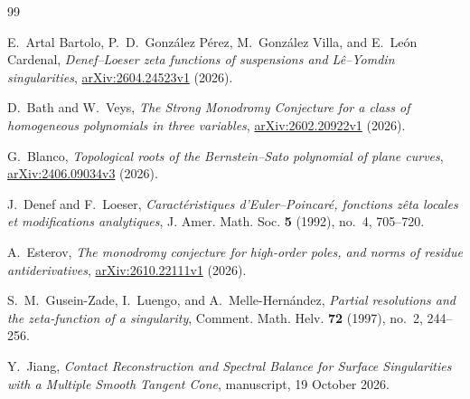 \documentclass[11pt]{article}
\numberwithin{equation}{section}
\theoremstyle{definition}
\theoremstyle{remark}
\begin{document}
\begin{thebibliography}{99}

E.~Artal Bartolo, P.~D.~Gonz\'alez P\'erez,
M.~Gonz\'alez Villa, and E.~Le\'on Cardenal,
\emph{Denef--Loeser zeta functions of suspensions and
L\^e--Yomdin singularities},
\href{https://arxiv.org/abs/2604.24523v1}{arXiv:2604.24523v1}
(2026).

D.~Bath and W.~Veys,
\emph{The Strong Monodromy Conjecture for a class of
homogeneous polynomials in three variables},
\href{https://arxiv.org/abs/2602.20922v1}{arXiv:2602.20922v1}
(2026).

G.~Blanco,
\emph{Topological roots of the Bernstein--Sato polynomial
of plane curves},
\href{https://arxiv.org/abs/2406.09034v3}{arXiv:2406.09034v3}
(2026).

J.~Denef and F.~Loeser,
\emph{Caract\'eristiques d'Euler--Poincar\'e, fonctions z\^eta
locales et modifications analytiques},
J. Amer. Math. Soc. \textbf{5} (1992), no.~4, 705--720.

A.~Esterov,
\emph{The monodromy conjecture for high-order poles,
and norms of residue antiderivatives},
\href{https://arxiv.org/abs/2610.22111v1}{arXiv:2610.22111v1}
(2026).

S.~M.~Gusein-Zade, I.~Luengo, and A.~Melle-Hern\'andez,
\emph{Partial resolutions and the zeta-function of a singularity},
Comment. Math. Helv. \textbf{72} (1997), no.~2, 244--256.

Y.~Jiang,
\emph{Contact Reconstruction and Spectral Balance for Surface
Singularities with a Multiple Smooth Tangent Cone},
manuscript, 19 October 2026.

\end{thebibliography}
\end{document}
